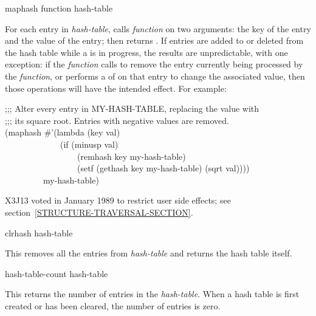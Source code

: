 \begin{defun}[Function]
maphash function hash-table

For each entry in {\it hash-table},  calls
{\it function} on two arguments:
the key of the entry and the value of the entry;  then returns .
If entries are added to or deleted from the hash table while a 
is in progress, the results are unpredictable, with one exception:
if the {\it function} calls  to remove the entry currently
being processed by the {\it function}, or performs a  of
 on that entry to change the associated value, then those
operations will have the intended effect.
For example:
\begin{lisp}
;;; Alter every entry in MY-HASH-TABLE, replacing the value with \\
;;; its square root.  Entries with negative values are removed. \\
(maphash \#'(lambda (key val) \\
~~~~~~~~~~~~~(if (minusp val) \\
~~~~~~~~~~~~~~~~~(remhash key my-hash-table) \\
~~~~~~~~~~~~~~~~~(setf (gethash key my-hash-table) (sqrt val)))) \\
~~~~~~~~~my-hash-table)
\end{lisp}

\begin{new}
X3J13 voted in January 1989
to restrict user side effects; see section~\ref{STRUCTURE-TRAVERSAL-SECTION}.
\end{new}
\end{defun}

\begin{defun}[Function]
clrhash hash-table

This removes all the entries from {\it hash-table}
and returns the hash table itself.
\end{defun}

\begin{defun}[Function]
hash-table-count hash-table

This returns the number of entries in the {\it hash-table}.
When a hash table is first created or has been cleared,
the number of entries is zero.
\end{defun}


